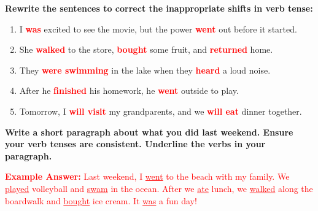 \documentclass[12pt]{article}
\begin{document}
\vspace{1em}

\begin{tcolorbox}[colframe=black!60, colback=white, 
coltitle=black, colbacktitle=black!15, fonttitle=\bfseries\Large, 
title=Independent Practice, halign title=center, left=10pt, right=10pt, top=10pt, bottom=15pt]
\textbf{Rewrite the sentences to correct the inappropriate shifts in verb tense:}
\begin{enumerate}[itemsep=3em]
    \item I \textbf{\textcolor{red}{was}} excited to see the movie, but the power \textbf{\textcolor{red}{went}} out before it started.
    \item She \textbf{\textcolor{red}{walked}} to the store, \textbf{\textcolor{red}{bought}} some fruit, and \textbf{\textcolor{red}{returned}} home.
    \item They \textbf{\textcolor{red}{were swimming}} in the lake when they \textbf{\textcolor{red}{heard}} a loud noise.
    \item After he \textbf{\textcolor{red}{finished}} his homework, he \textbf{\textcolor{red}{went}} outside to play.
    \item Tomorrow, I \textbf{\textcolor{red}{will visit}} my grandparents, and we \textbf{\textcolor{red}{will eat}} dinner together.
\end{enumerate}
\end{tcolorbox}

\vspace{1em}

\begin{tcolorbox}[colframe=black!60, colback=white, 
coltitle=black, colbacktitle=black!15, fonttitle=\bfseries\Large, 
title=Exit Ticket, halign title=center, left=10pt, right=10pt, top=5pt, bottom=15pt]

\textbf{Write a short paragraph about what you did last weekend. Ensure your verb tenses are consistent. Underline the verbs in your paragraph.}

\textcolor{red}{\textbf{Example Answer:}}  
\textcolor{red}{Last weekend, I \underline{went} to the beach with my family. We \underline{played} volleyball and \underline{swam} in the ocean. After we \underline{ate} lunch, we \underline{walked} along the boardwalk and \underline{bought} ice cream. It \underline{was} a fun day!}

\vspace{10cm}

\end{tcolorbox}
\end{document}
